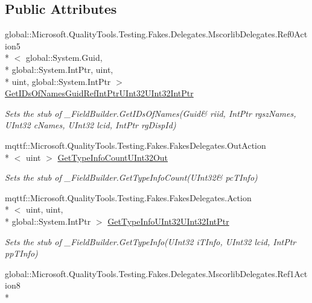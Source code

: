 \subsection*{Public Attributes}
\begin{DoxyCompactItemize}
\item 
global\-::\-Microsoft.\-Quality\-Tools.\-Testing.\-Fakes.\-Delegates.\-Mscorlib\-Delegates.\-Ref0\-Action5\\*
$<$ global\-::\-System.\-Guid, \\*
global\-::\-System.\-Int\-Ptr, uint, \\*
uint, global\-::\-System.\-Int\-Ptr $>$ \hyperlink{class_system_1_1_runtime_1_1_interop_services_1_1_fakes_1_1_stub___field_builder_a47b2f8abc7b25da29257736a0e557bfd}{Get\-I\-Ds\-Of\-Names\-Guid\-Ref\-Int\-Ptr\-U\-Int32\-U\-Int32\-Int\-Ptr}
\begin{DoxyCompactList}\small\item\em Sets the stub of \-\_\-\-Field\-Builder.\-Get\-I\-Ds\-Of\-Names(Guid\& riid, Int\-Ptr rgsz\-Names, U\-Int32 c\-Names, U\-Int32 lcid, Int\-Ptr rg\-Disp\-Id)\end{DoxyCompactList}\item 
mqttf\-::\-Microsoft.\-Quality\-Tools.\-Testing.\-Fakes.\-Fakes\-Delegates.\-Out\-Action\\*
$<$ uint $>$ \hyperlink{class_system_1_1_runtime_1_1_interop_services_1_1_fakes_1_1_stub___field_builder_a2f02c9cc8dca0e68759a8cf2e90e6347}{Get\-Type\-Info\-Count\-U\-Int32\-Out}
\begin{DoxyCompactList}\small\item\em Sets the stub of \-\_\-\-Field\-Builder.\-Get\-Type\-Info\-Count(U\-Int32\& pc\-T\-Info)\end{DoxyCompactList}\item 
mqttf\-::\-Microsoft.\-Quality\-Tools.\-Testing.\-Fakes.\-Fakes\-Delegates.\-Action\\*
$<$ uint, uint, \\*
global\-::\-System.\-Int\-Ptr $>$ \hyperlink{class_system_1_1_runtime_1_1_interop_services_1_1_fakes_1_1_stub___field_builder_a6ff42a1ad4e9a0638e8cb14ab39ac60c}{Get\-Type\-Info\-U\-Int32\-U\-Int32\-Int\-Ptr}
\begin{DoxyCompactList}\small\item\em Sets the stub of \-\_\-\-Field\-Builder.\-Get\-Type\-Info(\-U\-Int32 i\-T\-Info, U\-Int32 lcid, Int\-Ptr pp\-T\-Info)\end{DoxyCompactList}\item 
global\-::\-Microsoft.\-Quality\-Tools.\-Testing.\-Fakes.\-Delegates.\-Mscorlib\-Delegates.\-Ref1\-Action8\\*

\end{DoxyCompactItemize}
